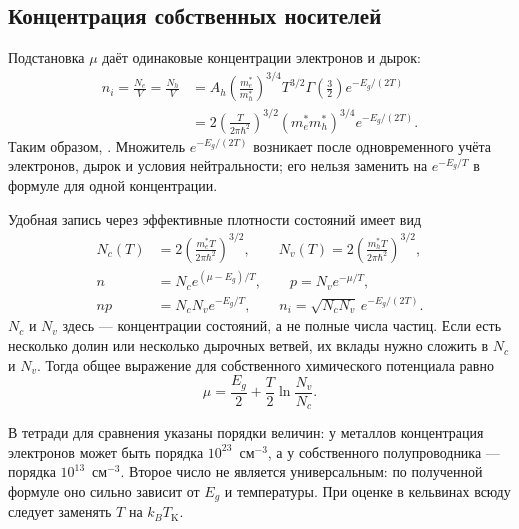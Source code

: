 \documentclass[../final.tex]{subfiles}
\begin{document}
\subsection{Концентрация собственных носителей}
Подстановка $\mu$ даёт одинаковые концентрации электронов и дырок:
\begin{align*}
 n_i=\frac{N_e}{V}=\frac{N_h}{V}
 &=A_h\left(\frac{m_e^*}{m_h^*}\right)^{3/4}
 T^{3/2}\Gamma\left(\frac32\right)e^{-E_g/(2T)}\\
 &=2\left(\frac{T}{2\pi\hbar^2}\right)^{3/2}
 (m_e^*m_h^*)^{3/4}e^{-E_g/(2T)}.
\end{align*}
Таким образом, . Множитель $e^{-E_g/(2T)}$ возникает после одновременного
учёта электронов, дырок и условия нейтральности; его нельзя заменить
на $e^{-E_g/T}$ в формуле для одной концентрации.

Удобная запись через эффективные плотности состояний имеет вид
\begin{align*}
 N_c(T)&=2\left(\frac{m_e^*T}{2\pi\hbar^2}\right)^{3/2},\qquad
 N_v(T)=2\left(\frac{m_h^*T}{2\pi\hbar^2}\right)^{3/2},\\
 n&=N_c e^{(\mu-E_g)/T},\qquad p=N_v e^{-\mu/T},\\
 np&=N_cN_v e^{-E_g/T},\qquad n_i=\sqrt{N_cN_v}\,e^{-E_g/(2T)}.
\end{align*}
$N_c$ и $N_v$ здесь --- концентрации состояний, а не полные числа частиц.
Если есть несколько долин или несколько дырочных ветвей, их вклады
нужно сложить в $N_c$ и $N_v$. Тогда общее выражение для собственного
химического потенциала равно
\begin{equation*}
 \mu=\frac{E_g}{2}+\frac T2\ln\frac{N_v}{N_c}.
\end{equation*}

В тетради для сравнения указаны порядки величин: у металлов концентрация
электронов может быть порядка $10^{23}$~см$^{-3}$, а у собственного
полупроводника --- порядка $10^{13}$~см$^{-3}$.
Второе число не является универсальным: по полученной формуле оно сильно
зависит от $E_g$ и температуры. При оценке в кельвинах всюду следует
заменять $T$ на $k_BT_{\mathrm K}$.

\end{document}
